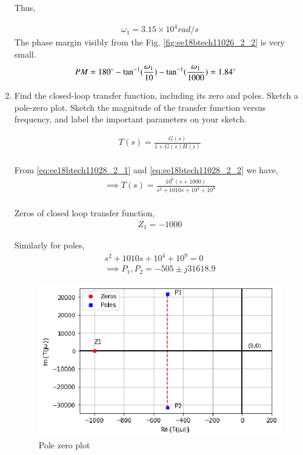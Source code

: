 \begin{enumerate}[label=\thesection.\arabic*.,ref=\thesection.\theenumi]
Thus, 

\begin{align}
     \omega_{1} = 3.15 \times 10^{4} rad/s
\end{align}
The phase margin visibly from the Fig. \ref{fig:ee18btech11026_2_2} is very small.
\begin{align}
    PM = 180 \degree - \tan^{-1}(\frac{\omega_{1}}{10}) - \tan^{-1}(\frac{\omega_{1}}{1000})
      & = 1.84 \degree
\end{align}

\item Find the closed-loop transfer function, including its zero
and poles. Sketch a pole-zero plot. Sketch the magnitude of
the transfer function versus frequency, and label the important parameters on your sketch.
\\ 
\solution

\begin{align}
    T(s) = \frac{G(s)}{1 + G(s)H(s)}
    \\
\end{align}

From \eqref{eq:ee18btech11028_2_1} and \eqref{eq:ee18btech11028_2_2} we have,
\begin{align}
    \implies T(s) = \frac{10^{6}(s+1000)}{s^{2} + 1010s + 10^{4} + 10^{9}}
    \\
\end{align}

Zeros of closed loop transfer function,
\begin{align}
    Z_{1} = -1000
\end{align}

Similarly for poles,
\begin{align}
    s^{2} + 1010s + 10^{4} + 10^{9} = 0
    \\
    \implies P_{1}, P_{2} = -505 \pm j31618.9
\end{align}

\begin{figure}[!ht]
    \centering
    \includegraphics[width=\columnwidth]{./figs/ee18btech11028/ee18btech11028_2_3.eps}
    \caption{Pole zero plot}
    \label{fig:ee18btech11026_2_3}
\end{figure}



\end{enumerate}
